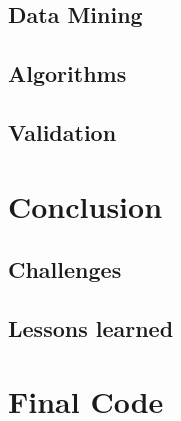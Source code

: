 \documentclass[notitlepage,english]{hgbreport}
\begin{document}
\section{Data Mining}
\label{sec:DataMining}

\section{Algorithms}
\label{sec:algorithmsProject}

\section{Validation}

\chapter{Conclusion}

\section{Challenges}

\section{Lessons learned}

\appendix %

\chapter{Final Code}

\MakeBibliography[nosplit]
\end{document}
